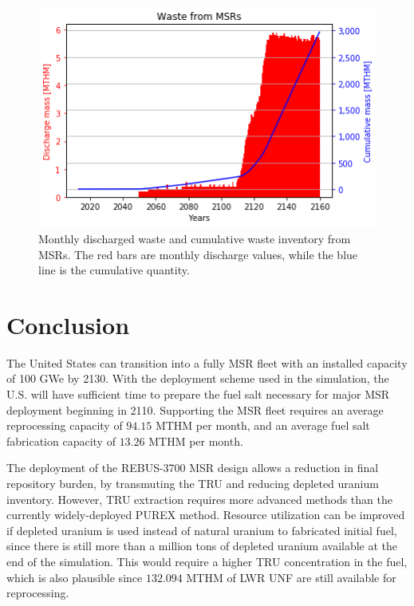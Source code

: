 \begin{figure}[htbp!]
	\begin{center}
		\includegraphics[scale=0.7]{./images/us/msr_waste.png}
	\end{center}
	\caption{Monthly discharged waste and cumulative waste inventory from
			\glspl{MSR}. The red bars are monthly discharge values, while
			the blue line is the cumulative quantity.}
	\label{fig:msr_waste}
\end{figure}


\section{Conclusion}
The United States can transition into a fully \gls{MSR} fleet with an
installed capacity of 100 GWe by 2130. With the deployment
scheme used in the simulation, the U.S. will have sufficient
time to prepare the fuel salt necessary for major \gls{MSR} deployment
beginning in 2110. Supporting the \gls{MSR} fleet requires an average
reprocessing capacity of $94.15$ MTHM per month, and an average fuel salt
fabrication capacity of $13.26$ MTHM per month. 

The deployment of the REBUS-3700 \gls{MSR} design allows a reduction
in final repository burden, by transmuting the \gls{TRU} and reducing depleted uranium inventory.
However, \gls{TRU} extraction requires more advanced methods than the currently
widely-deployed PUREX method. Resource utilization can be improved if depleted
uranium is used instead of natural uranium to fabricated initial fuel, since
there is still more than a million tons of depleted uranium available at the
end of the simulation. This would require a higher \gls{TRU} concentration
in the fuel, which is also plausible since $132.094$ MTHM of \gls{LWR} \gls{UNF}
are still available for reprocessing.

